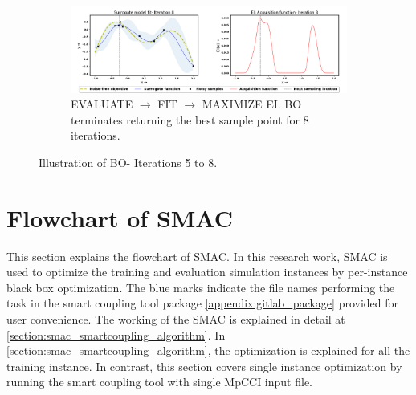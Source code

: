 \begin{figure}[!ht]
\begin{subfigure}{1\textwidth}
  			\label{fig:BO7}
		\end{subfigure}
		\begin{subfigure}{1\textwidth}
  			\centering
  			\includegraphics[width=1\linewidth, height=0.2\textheight]{images/BO8.png}
  			\caption{EVALUATE $\rightarrow$ FIT $\rightarrow$ MAXIMIZE EI. BO terminates returning the best sample point for 8 iterations.}
  			\label{fig:BO8}
			\end{subfigure}
\captionsetup{justification=justified}
\caption[Illustration of BO- Iterations 5 to 8.]{Illustration of BO- Iterations 5 to 8.}
\label{fig:BO_steps2}
\end{figure}

\chapter{Flowchart of SMAC}
\label{chapter:smac_flowchart}

This section explains the flowchart of SMAC. In this research work, SMAC is used to optimize the training and evaluation simulation instances by per-instance black box optimization.  The blue marks indicate the file names performing the task in the smart coupling tool package \ref{appendix:gitlab_package} provided for user convenience. The working of the SMAC is explained in detail at \ref{section:smac_smartcoupling_algorithm}. In \ref{section:smac_smartcoupling_algorithm}, the optimization is explained for all the training instance. In contrast, this section covers single instance optimization by running the smart coupling tool with single MpCCI input file. 

